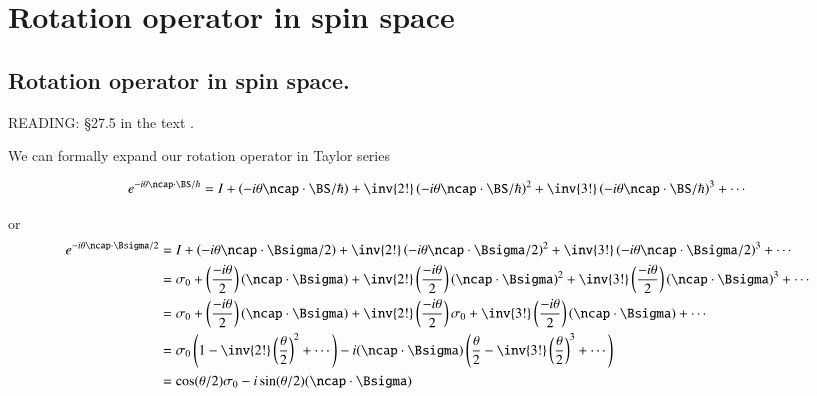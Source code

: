 %
%

\chapter{Rotation operator in spin space}
\label{chap:qmTwoL15}
{}
\date{Oct 31, 2011}

\beginArtWithToc

%
%
\section{Rotation operator in spin space.}

READING: \S 27.5 in the text \cite{desai2009quantum}.

We can formally expand our rotation operator in Taylor series

\begin{equation}\label{eqn:qmTwoL15:10}
e^{-i \theta \ncap \cdot \BS/\hbar}
= 
I 
+
\left(-i \theta \ncap \cdot \BS/\hbar\right)
+
\inv{2!}
\left(-i \theta \ncap \cdot \BS/\hbar\right)^2
+
\inv{3!}
\left(-i \theta \ncap \cdot \BS/\hbar\right)^3
+ \cdots
\end{equation}

or
\begin{align*}
e^{-i \theta \ncap \cdot \Bsigma/2}
&= 
I 
+
\left(-i \theta \ncap \cdot \Bsigma/2\right)
+
\inv{2!}
\left(-i \theta \ncap \cdot \Bsigma/2\right)^2
+
\inv{3!}
\left(-i \theta \ncap \cdot \Bsigma/2\right)^3
+ \cdots \\
&=
\sigma_0 
+
\left(\frac{-i \theta}{2}\right) (\ncap \cdot \Bsigma)
+
\inv{2!} \left(\frac{-i \theta}{2}\right) (\ncap \cdot \Bsigma)^2
+
\inv{3!} \left(\frac{-i \theta}{2}\right) (\ncap \cdot \Bsigma)^3
+ \cdots \\
&=
\sigma_0 
+
\left(\frac{-i \theta}{2}\right) (\ncap \cdot \Bsigma)
+
\inv{2!} \left(\frac{-i \theta}{2}\right) \sigma_0
+
\inv{3!} \left(\frac{-i \theta}{2}\right) (\ncap \cdot \Bsigma) 
+ \cdots \\
&=
\sigma_0 \left( 1 - \inv{2!}\left(\frac{\theta}{2}\right)^2 + \cdots \right) 
-i
(\ncap \cdot \Bsigma) \left( \frac{\theta}{2} - \inv{3!}\left(\frac{\theta}{2}\right)^3 + \cdots \right) \\
&=
\cos(\theta/2) \sigma_0 - i \sin(\theta/2) (\ncap \cdot \Bsigma)
\end{align*}

